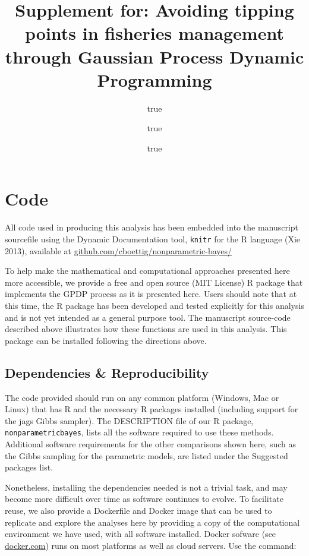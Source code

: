 \documentclass[]{components/elsarticle}
\title{Supplement for: Avoiding tipping points in fisheries management through
Gaussian Process Dynamic Programming}
\author{true \and true \and true}
\date{}
\begin{document}
\maketitle


\tableofcontents

\appendix
\renewcommand*{\thefigure}{S\arabic{figure}}
\renewcommand*{\thetable}{S\arabic{table}} \setcounter{figure}{0}
\setcounter{table}{0}

\section{Code}\label{code}

All code used in producing this analysis has been embedded into the
manuscript sourcefile using the Dynamic Documentation tool,
\texttt{knitr} for the R language (Xie 2013), available at
\href{https://github.com/cboettig/nonparametric-bayes/}{github.com/cboettig/nonparametric-bayes/}

To help make the mathematical and computational approaches presented
here more accessible, we provide a free and open source (MIT License) R
package that implements the GPDP process as it is presented here. Users
should note that at this time, the R package has been developed and
tested explicitly for this analysis and is not yet intended as a general
purpose tool. The manuscript source-code described above illustrates how
these functions are used in this analysis. This package can be installed
following the directions above.

\subsection{Dependencies \&
Reproducibility}\label{dependencies-reproducibility}

The code provided should run on any common platform (Windows, Mac or
Linux) that has R and the necessary R packages installed (including
support for the jags Gibbs sampler). The DESCRIPTION file of our R
package, \texttt{nonparametricbayes}, lists all the software required to
use these methods. Additional software requirements for the other
comparisons shown here, such as the Gibbs sampling for the parametric
models, are listed under the Suggested packages list.

Nonetheless, installing the dependencies needed is not a trivial task,
and may become more difficult over time as software continues to evolve.
To facilitate reuse, we also provide a Dockerfile and Docker image that
can be used to replicate and explore the analyses here by providing a
copy of the computational environment we have used, with all software
installed. Docker sofware (see \href{http://www.docker.com}{docker.com})
runs on most platforms as well as cloud servers. Use the command:
\end{document}
